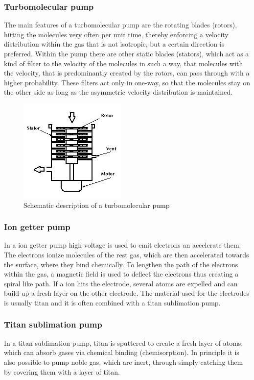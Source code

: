 \documentclass[a4paper]{scrartcl}
\numberwithin{equation}{section}
\numberwithin{figure}{section}
\numberwithin{table}{section}
\begin{document}
\subsubsection{Turbomolecular pump}
The main features of a turbomolecular pump are the rotating blades (rotors), hitting the molecules very often per unit time, thereby enforcing a velocity distribution within the gas that is not isotropic, but a certain direction is preferred. Within the pump there are other static blades (stators), which act as a kind of filter to the velocity of the molecules in such a way, that molecules with the velocity, that is predominantly created by the rotors, can pass through with a higher probability. These filters act only in one-way, so that the molecules stay on the other side as long as the asymmetric velocity distribution is maintained. 
\begin{figure}
  \centering
  
   	\includegraphics[width=0.3\linewidth]{pic/tu.jpg}

 \caption{\small Schematic description of a turbomolecular pump}
        \label{fig:turbo}
\end{figure}


\subsubsection{Ion getter pump}
In a ion getter pump high voltage is used to emit electrons an accelerate them. The electrons ionize molecules of the rest gas, which are then accelerated towards the surface, where they bind chemically. To lengthen the path of the electrons within the gas, a magnetic field is used to deflect the electrons thus creating a spiral like path. If a ion hits the electrode, several atoms are expelled and can build up a fresh layer on the other electrode. The material used for the electrodes is usually titan and it is often combined with a titan sublimation pump.

\subsubsection{Titan sublimation pump}
In a titan sublimation pump, titan is sputtered to create a fresh layer of atoms, which can absorb gases via chemical binding (chemisorption). In principle it is also possible to pump noble gas, which are inert, through simply catching them by covering them with a layer of titan. 
\end{document}
